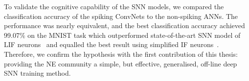 %	
%	
%	
%	


To validate the cognitive capability of the SNN models, we compared the classification accuracy of the spiking ConvNets to the non-spiking ANNs.
The performance was nearly equivalent, and the best classification accuracy achieved 99.07\% on the MNIST task which outperformed state-of-the-art SNN model of LIF neurons~\citep{hunsberger2015spiking} and equalled the best result using simplified IF neurons~\citep{diehl2015fast}.
Therefore, we confirm the hypothesis with the first contribution of this thesis: providing the NE community a simple, but effective, generalised, off-line deep SNN training method.

